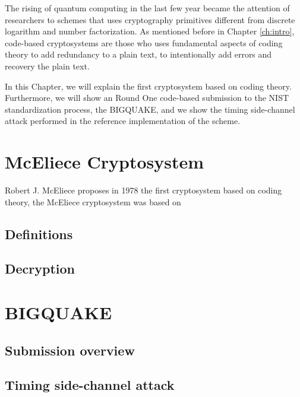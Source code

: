 The rising of quantum computing in the last few year became the attention of researchers to schemes that uses cryptography primitives different from discrete logarithm and number factorization. As mentioned before in Chapter \ref{ch:intro}, code-based cryptosystems are those who uses fundamental aspects of coding theory to add redundancy to a plain text, to intentionally add errors and recovery the plain text. 

In this Chapter, we will explain the first cryptosystem based on coding theory. Furthermore, we will show an Round One code-based submission to the NIST standardization process, the BIGQUAKE, and we show the timing side-channel attack performed in the reference implementation of the scheme.

\section{McEliece Cryptosystem}
Robert J. McEliece proposes in 1978 the first cryptosystem based on coding theory, the McEliece cryptosystem was based on \cite{mceliece1978public}
\subsection{Definitions}
\subsection{Decryption}
\section{BIGQUAKE}
\subsection{Submission overview}
\subsection{Timing side-channel attack}